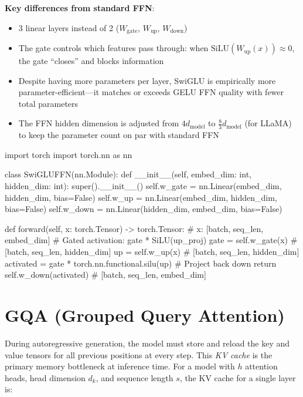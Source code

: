 \begin{keyconcept}
  \textbf{Key differences from standard FFN}:
  \begin{itemize}
    \item 3 linear layers instead of 2 ($W_{\text{gate}}$,
          $W_{\text{up}}$, $W_{\text{down}}$)
    \item The gate controls which features pass through: when
          $\text{SiLU}(W_{\text{up}}(x)) \approx 0$, the gate ``closes''
          and blocks information
    \item Despite having more parameters per layer, SwiGLU is
          empirically more parameter-efficient---it matches or exceeds
          GELU FFN quality with fewer total parameters
    \item The FFN hidden dimension is adjusted from $4d_{\text{model}}$ to
          $\frac{8}{3}d_{\text{model}}$ (for LLaMA) to keep the parameter
          count on par with standard FFN
  \end{itemize}
\end{keyconcept}

\begin{pseudocode}
import torch
import torch.nn as nn

class SwiGLUFFN(nn.Module):
    def __init__(self, embed_dim: int, hidden_dim: int):
        super().__init__()
        self.w_gate = nn.Linear(embed_dim, hidden_dim, bias=False)
        self.w_up   = nn.Linear(embed_dim, hidden_dim, bias=False)
        self.w_down  = nn.Linear(hidden_dim, embed_dim, bias=False)

    def forward(self, x: torch.Tensor) -> torch.Tensor:
        # x: [batch, seq_len, embed_dim]
        # Gated activation: gate * SiLU(up_proj)
        gate = self.w_gate(x)                  # [batch, seq_len, hidden_dim]
        up   = self.w_up(x)                    # [batch, seq_len, hidden_dim]
        activated = gate * torch.nn.functional.silu(up)
        # Project back down
        return self.w_down(activated)           # [batch, seq_len, embed_dim]
\end{pseudocode}

\section{\texorpdfstring{GQA}{GQA} (Grouped Query Attention)}

During autoregressive generation, the model must store and reload the key and
value tensors for all previous positions at every step. This \emph{KV cache}
is the primary memory bottleneck at inference time. For a model with $h$
attention heads, head dimension $d_k$, and sequence length $s$, the KV cache
for a single layer is:

